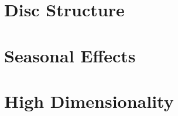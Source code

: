 
\section{Disc Structure}
\label{Extending_HMM_Based_Rainfall_Models:Disc_Structure}

\section{Seasonal Effects}
\label{Extending_HMM_Based_Rainfall_Models:Seasonal_Effects}

\section{High Dimensionality}
\label{Extending_HMM_Based_Rainfall_Models:High_Dimensionality}